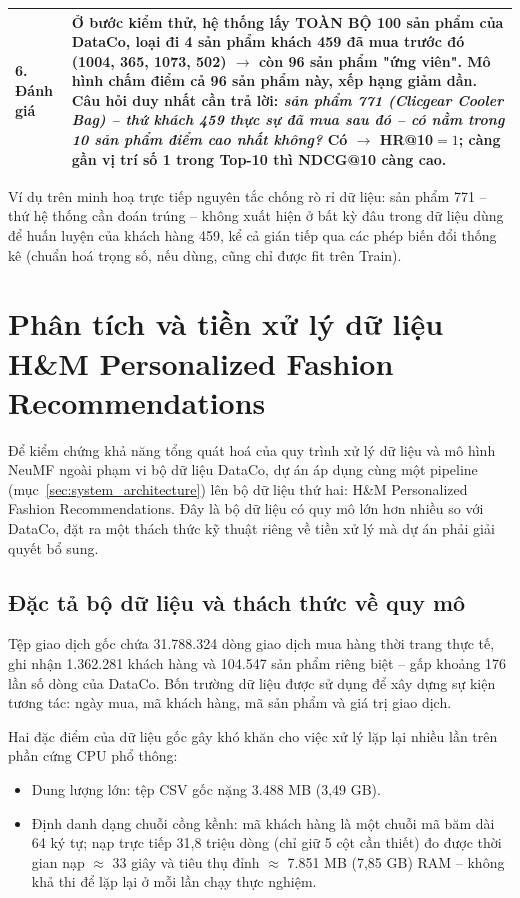 \begin{table}[htbp]
\begin{tabular}{|p{2.5cm}|p{11.3cm}|}
        \hline
        6. Đánh giá &
        Ở bước kiểm thử, hệ thống lấy TOÀN BỘ 100 sản phẩm của DataCo, loại đi 4 sản phẩm khách 459 đã mua trước đó (1004, 365, 1073, 502) $\to$ còn 96 sản phẩm "ứng viên". Mô hình chấm điểm cả 96 sản phẩm này, xếp hạng giảm dần. Câu hỏi duy nhất cần trả lời: \emph{sản phẩm 771 (Clicgear Cooler Bag) -- thứ khách 459 thực sự đã mua sau đó -- có nằm trong 10 sản phẩm điểm cao nhất không?} Có $\to$ HR@10$=1$; càng gần vị trí số 1 trong Top-10 thì NDCG@10 càng cao. \\
        \hline
    \end{tabular}
\end{table}

Ví dụ trên minh hoạ trực tiếp nguyên tắc chống rò rỉ dữ liệu: sản phẩm 771 -- thứ hệ thống cần đoán trúng -- không xuất hiện ở bất kỳ đâu trong dữ liệu dùng để huấn luyện của khách hàng 459, kể cả gián tiếp qua các phép biến đổi thống kê (chuẩn hoá trọng số, nếu dùng, cũng chỉ được fit trên Train).

\section{Phân tích và tiền xử lý dữ liệu H\&M Personalized Fashion Recommendations}
\label{sec:hm_pipeline}

Để kiểm chứng khả năng tổng quát hoá của quy trình xử lý dữ liệu và mô hình NeuMF ngoài phạm vi bộ dữ liệu DataCo, dự án áp dụng cùng một pipeline (mục~\ref{sec:system_architecture}) lên bộ dữ liệu thứ hai: H\&M Personalized Fashion Recommendations. Đây là bộ dữ liệu có quy mô lớn hơn nhiều so với DataCo, đặt ra một thách thức kỹ thuật riêng về tiền xử lý mà dự án phải giải quyết bổ sung.

\subsection{Đặc tả bộ dữ liệu và thách thức về quy mô}
\label{subsec:hm_description}

Tệp giao dịch gốc chứa 31.788.324 dòng giao dịch mua hàng thời trang thực tế, ghi nhận 1.362.281 khách hàng và 104.547 sản phẩm riêng biệt -- gấp khoảng 176 lần số dòng của DataCo. Bốn trường dữ liệu được sử dụng để xây dựng sự kiện tương tác: ngày mua, mã khách hàng, mã sản phẩm và giá trị giao dịch.

Hai đặc điểm của dữ liệu gốc gây khó khăn cho việc xử lý lặp lại nhiều lần trên phần cứng CPU phổ thông:
\begin{itemize}
    \item Dung lượng lớn: tệp CSV gốc nặng 3.488 MB (3,49 GB).
    \item Định danh dạng chuỗi cồng kềnh: mã khách hàng là một chuỗi mã băm dài 64 ký tự; nạp trực tiếp 31,8 triệu dòng (chỉ giữ 5 cột cần thiết) đo được thời gian nạp $\approx$ 33 giây và tiêu thụ đỉnh $\approx$ 7.851 MB (7,85 GB) RAM -- không khả thi để lặp lại ở mỗi lần chạy thực nghiệm.
\end{itemize}

